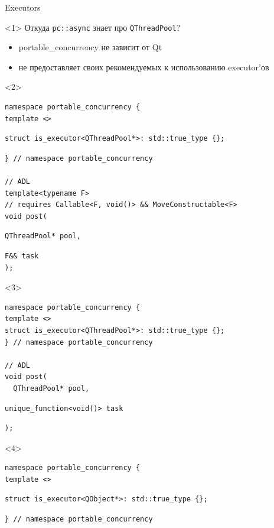 \documentclass[aspectratio=169,hyperref={unicode},17pt]{beamer}
\begin{document}
\begin{frame}[fragile,t]{Executors}
\begin{onlyenv}<1>
Откуда \texttt{pc::async} знает про \texttt{QThreadPool}?
\begin{itemize}
 \item portable\_concurrency не зависит от Qt
 \item не предоставляет своих рекомендуемых к использованию executor'ов
\end{itemize}
\end{onlyenv}
\begin{onlyenv}<2>
\begin{lstlisting}[style=cppcode,belowskip=0pt]
namespace portable_concurrency {
template <>
\end{lstlisting}
\begin{lstlisting}[style=cppcode,backgroundcolor=\color{gray!30},aboveskip=0pt,belowskip=0pt]
struct is_executor<QThreadPool*>: std::true_type {};
\end{lstlisting}
\begin{lstlisting}[style=cppcode,aboveskip=0pt,belowskip=0pt]
} // namespace portable_concurrency

// ADL
template<typename F>
// requires Callable<F, void()> && MoveConstructable<F>
void post(
\end{lstlisting}
\begin{lstlisting}[style=cppcode,backgroundcolor=\color{gray!30},aboveskip=0pt,belowskip=0pt]
  QThreadPool* pool,
\end{lstlisting}
\begin{lstlisting}[style=cppcode,aboveskip=0pt,belowskip=0pt]
  F&& task
);
\end{lstlisting}
\end{onlyenv}
\begin{onlyenv}<3>
\begin{lstlisting}[style=cppcode,belowskip=0pt]
namespace portable_concurrency {
template <>
struct is_executor<QThreadPool*>: std::true_type {};
} // namespace portable_concurrency

// ADL
void post(
  QThreadPool* pool,
\end{lstlisting}
\begin{lstlisting}[style=cppcode,backgroundcolor=\color{gray!30},aboveskip=0pt,belowskip=0pt]
  unique_function<void()> task
\end{lstlisting}
\begin{lstlisting}[style=cppcode,aboveskip=0pt,belowskip=0pt]
);
\end{lstlisting}
\end{onlyenv}
\begin{onlyenv}<4>
\begin{lstlisting}[style=cppcode,belowskip=0pt]
namespace portable_concurrency {
template <>
\end{lstlisting}
\begin{lstlisting}[style=cppcode,backgroundcolor=\color{gray!30},aboveskip=0pt,belowskip=0pt]
struct is_executor<QObject*>: std::true_type {};
\end{lstlisting}
\begin{lstlisting}[style=cppcode,aboveskip=0pt,belowskip=0pt]
} // namespace portable_concurrency


\end{lstlisting}
\end{onlyenv}
\end{frame}
\end{document}
